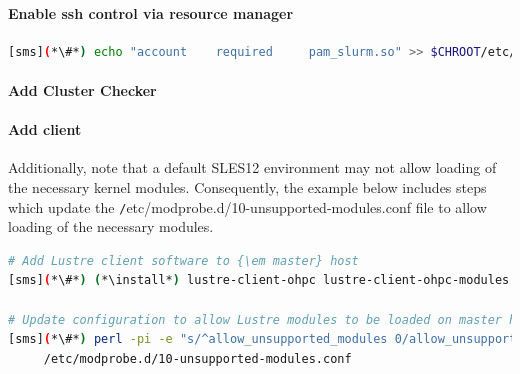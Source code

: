 \documentclass[letterpaper]{article}
\newcommand{\baseOS}{SLES12}
\newcommand{\install}{zypper -n install}
\begin{document}
\paragraph{Enable ssh control via resource manager} 



\begin{lstlisting}[language=bash,keywords={},upquote=true]
[sms](*\#*) echo "account    required     pam_slurm.so" >> $CHROOT/etc/pam.d/sshd
\end{lstlisting}

\paragraph{Add Cluster Checker} \label{sec:add_clck}


\paragraph{Add \Lustre{} client} \label{sec:lustre_client}


Additionally, note that a default \baseOS{} environment may not allow loading of
the necessary \Lustre{} kernel modules. Consequently, the example below includes
steps which update the {\texttt /etc/modprobe.d/10-unsupported-modules.conf}
file to allow loading of the necessary modules.


\begin{lstlisting}[language=bash,keywords={},upquote=true]
# Add Lustre client software to {\em master} host
[sms](*\#*) (*\install*) lustre-client-ohpc lustre-client-ohpc-modules

# Update configuration to allow Lustre modules to be loaded on master host
[sms](*\#*) perl -pi -e "s/^allow_unsupported_modules 0/allow_unsupported_modules 1/" \
     /etc/modprobe.d/10-unsupported-modules.conf
\end{lstlisting}
\end{document}
